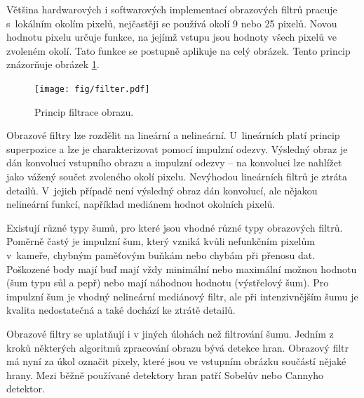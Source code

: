 Většina hardwarových i softwarových implementací obrazových filtrů pracuje s~lokálním okolím pixelů, nejčastěji se používá okolí 9 nebo 25 pixelů. Novou hodnotu pixelu určuje funkce, na jejímž vstupu jsou hodnoty všech pixelů ve zvoleném okolí. Tato funkce se postupně aplikuje na celý obrázek. Tento princip znázorňuje obrázek \ref{obrIFokoli}.

\begin{figure}[htb]
    \centering\texttt{[image: fig/filter.pdf]}
    \caption{Princip filtrace obrazu.}
    \label{obrIFokoli}
\end{figure}

Obrazové filtry lze rozdělit na lineární a nelineární. U~lineárních platí princip superpozice a lze je charakterizovat pomocí impulzní odezvy. Výsledný obraz je dán konvolucí vstupního obrazu a impulzní odezvy -- na konvoluci lze nahlížet jako vážený součet zvoleného okolí pixelu. Nevýhodou lineárních filtrů je ztráta detailů. V~jejich případě není výsledný obraz dán konvolucí, ale nějakou nelineární funkcí, například mediánem hodnot okolních pixelů.

Existují různé typy šumů, pro které jsou vhodné různé typy obrazových filtrů. Poměrně častý je impulzní šum, který vzniká kvůli nefunkčním pixelům v~kameře, chybným paměťovým buňkám nebo chybám při přenosu dat. Poškozené body mají buď mají vždy minimální nebo maximální možnou hodnotu (šum typu sůl a pepř) nebo mají náhodnou hodnotu (výstřelový šum). Pro impulzní šum je vhodný nelineární mediánový filtr, ale při intenzivnějším šumu je kvalita nedostatečná a také dochází ke ztrátě detailů.

Obrazové filtry se uplatňují i v jiných úlohách než filtrování šumu. Jedním z kroků některých algoritmů zpracování obrazu bývá detekce hran. Obrazový filtr má nyní za úkol označit pixely, které jsou ve vstupním obrázku součástí nějaké hrany. Mezi běžně používané detektory hran patří Sobelův nebo Cannyho detektor.

